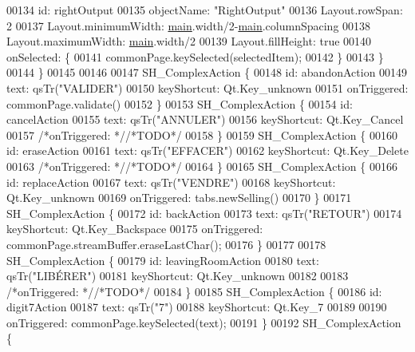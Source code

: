 \begin{DoxyCode}
00134             \textcolor{keywordtype}{id}: rightOutput
00135             objectName: \textcolor{stringliteral}{"RightOutput"}
00136             Layout.rowSpan: 2
00137             Layout.minimumWidth: \hyperlink{main_8cpp_a3c04138a5bfe5d72780bb7e82a18e627}{main}.width/2-\hyperlink{main_8cpp_a3c04138a5bfe5d72780bb7e82a18e627}{main}.columnSpacing
00138             Layout.maximumWidth: \hyperlink{main_8cpp_a3c04138a5bfe5d72780bb7e82a18e627}{main}.width/2
00139             Layout.fillHeight: \textcolor{keyword}{true}
00140             onSelected: \{
00141                 commonPage.keySelected(selectedItem);
00142             \}
00143         \}
00144     \}
00145 
00146 
00147     SH\_ComplexAction \{
00148         \textcolor{keywordtype}{id}: abandonAction
00149         text: qsTr(\textcolor{stringliteral}{"VALIDER"})
00150         keyShortcut: Qt.Key\_unknown
00151         onTriggered: commonPage.validate()
00152     \}
00153     SH\_ComplexAction \{
00154         \textcolor{keywordtype}{id}: cancelAction
00155         text: qsTr(\textcolor{stringliteral}{"ANNULER"})
00156         keyShortcut: Qt.Key\_Cancel
00157         \textcolor{comment}{/*onTriggered: */}\textcolor{comment}{/*TODO*/}
00158     \}
00159     SH\_ComplexAction \{
00160         \textcolor{keywordtype}{id}: eraseAction
00161         text: qsTr(\textcolor{stringliteral}{"EFFACER"})
00162         keyShortcut: Qt.Key\_Delete
00163         \textcolor{comment}{/*onTriggered: */}\textcolor{comment}{/*TODO*/}
00164     \}
00165     SH\_ComplexAction \{
00166         \textcolor{keywordtype}{id}: replaceAction
00167         text: qsTr(\textcolor{stringliteral}{"VENDRE"})
00168         keyShortcut: Qt.Key\_unknown
00169         onTriggered: tabs.newSelling()
00170     \}
00171     SH\_ComplexAction \{
00172         \textcolor{keywordtype}{id}: backAction
00173         text: qsTr(\textcolor{stringliteral}{"RETOUR"})
00174         keyShortcut: Qt.Key\_Backspace
00175         onTriggered: commonPage.streamBuffer.eraseLastChar();
00176     \}
00177 
00178     SH\_ComplexAction \{
00179         \textcolor{keywordtype}{id}: leavingRoomAction
00180         text: qsTr(\textcolor{stringliteral}{"LIBÉRER"})
00181         keyShortcut: Qt.Key\_unknown
00182 
00183         \textcolor{comment}{/*onTriggered: */}\textcolor{comment}{/*TODO*/}
00184     \}
00185     SH\_ComplexAction \{
00186         \textcolor{keywordtype}{id}: digit7Action
00187         text: qsTr(\textcolor{stringliteral}{"7"})
00188         keyShortcut: Qt.Key\_7
00189 
00190         onTriggered: commonPage.keySelected(text);
00191     \}
00192     SH\_ComplexAction \{

\end{DoxyCode}
